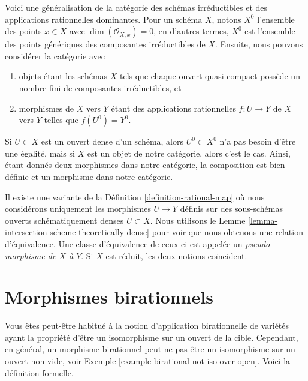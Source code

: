 \begin{remark}
\label{remark-generalize-category}
Voici une généralisation de la catégorie des schémas irréductibles et des applications
rationnelles dominantes. Pour un schéma $X$, notons $X^0$ l'ensemble
des points $x \in X$ avec $\dim(\mathcal{O}_{X, x}) = 0$, en d'autres termes, $X^0$ est l'ensemble
des points génériques des composantes irréductibles de $X$. Ensuite,
nous pouvons considérer la catégorie avec
\begin{enumerate}
\item objets étant les schémas $X$ tels que chaque ouvert quasi-compact possède
un nombre fini de composantes irréductibles, et
\item morphismes de $X$ vers $Y$ étant des applications rationnelles $f : U \to Y$
de $X$ vers $Y$ telles que $f(U^0) = Y^0$.
\end{enumerate}
Si $U \subset X$ est un ouvert dense d'un schéma, alors $U^0 \subset X^0$
n'a pas besoin d'être une égalité, mais si $X$ est un objet
de notre catégorie, alors c'est le cas. Ainsi, étant
donnés deux morphismes dans notre catégorie, la composition est
bien définie et un morphisme dans notre catégorie.
\end{remark}

\begin{remark}
\label{remark-pseudo-morphisms}
Il existe une variante de la Définition \ref{definition-rational-map} où nous considérons
uniquement les morphismes $U \to Y$ définis sur des sous-schémas
ouverts schématiquement denses $U \subset X$. Nous utilisons le
Lemme \ref{lemma-intersection-scheme-theoretically-dense} pour voir que nous obtenons une relation d'équivalence.
Une classe d'équivalence de ceux-ci est appelée
un {\it pseudo-morphisme de $X$
à $Y$}. Si $X$
est réduit, les deux notions coïncident.
\end{remark}






\section{Morphismes birationnels}
\label{section-birational}

\noindent
Vous êtes peut-être habitué à la notion d'application birationnelle
de variétés ayant la propriété d'être un isomorphisme sur
un ouvert de la cible. Cependant, en général, un morphisme
birationnel peut ne pas être un isomorphisme sur
un ouvert non vide, voir Exemple \ref{example-birational-not-iso-over-open}. Voici
la définition formelle.

